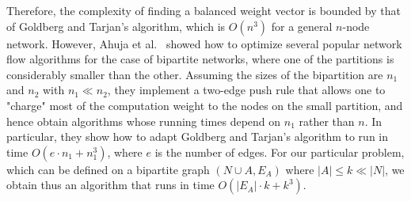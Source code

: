 Therefore, the complexity of finding a balanced weight vector is bounded by that of Goldberg and Tarjan’s algorithm, which is $O(n^3)$ for a general $n$-node network. 
However, Ahuja et al.~\cite{ahuja1994improved} showed how to optimize several popular network flow algorithms for the case of bipartite networks, where one of the partitions is considerably smaller than the other. Assuming the sizes of the bipartition are $n_1$ and $n_2$ with $n_1 \ll n_2$, they implement a two-edge push rule that allows one to "charge" most of the computation weight to the nodes on the small partition, and hence obtain algorithms whose running times depend on $n_1$ rather than $n$. 
In particular, they show how to adapt Goldberg and Tarjan’s algorithm to run in time $O(e\cdot n_1+n_1^3)$, where $e$ is the number of edges. 
For our particular problem, which can be defined on a bipartite graph $(N\cup A, E_A)$ where $|A|\leq k\ll |N|$, we obtain thus an algorithm that runs in time $O(|E_A|\cdot k + k^3)$.